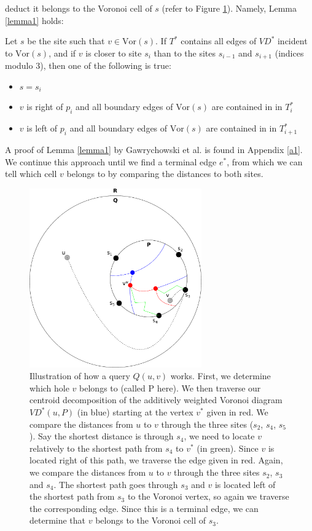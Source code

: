 deduct it belongs to the Voronoi cell of $s$ (refer to Figure \ref{vd1}). Namely, Lemma
\ref{lemma1} holds:
\begin{lemma}\label{lemma1}
  Let $s$ be the site such that $v\in \text{Vor}(s)$. If $T^*$ contains all edges of
  $VD^*$ incident to $\text{Vor}(s)$, and if $v$ is closer to site $s_i$ than to the
  sites $s_{i-1}$ and $s_{i+1}$ (indices modulo $3$), then one of the following is true:
  \begin{itemize}
    \item $s=s_i$
    \item $v$ is right of $p_i$ and all boundary edges of $\text{Vor}(s)$ are contained
      in in $T_i^*$
    \item $v$ is left of $p_i$ and all boundary edges of $\text{Vor}(s)$ are contained
      in in $T_{i+1}^*$
  \end{itemize}
\end{lemma}
\noindent A proof of Lemma \ref{lemma1} by Gawrychowski et al. \cite{gawrychowski2017better} is
found in Appendix \ref{a1}. \\
We continue this approach until we find a
terminal edge $e^*$, from which we can tell which cell $v$ belongs to by comparing the
distances to both sites.

\begin{figure}[h!]
  \centering
  \includegraphics[width=0.66\textwidth]{figs/vd1.pdf}
  \caption{Illustration of how a query $Q(u,v)$ works. First, we determine which hole $v$
  belongs to (called P here). We then traverse our centroid decomposition of the
  additively weighted Voronoi diagram $VD^*(u,P)$ (in blue) starting at the vertex $v^*$ given in
red. We compare the distances from $u$ to $v$ through the three sites ($s_2$, $s_4$,
$s_5$). Say the shortest distance is through $s_4$, we need to locate $v$ relatively to
the shortest path from $s_4$ to $v^*$ (in green). Since $v$ is
located right of this path, we traverse the edge given in red. Again, we compare the
distances from $u$ to $v$ through the three sites $s_2$, $s_3$ and $s_4$. The shortest
path goes through $s_3$ and $v$ is located left of the shortest path from $s_3$ to the
Voronoi vertex, so again we traverse the corresponding edge. Since this is a terminal
edge, we can determine that $v$ belongs to the Voronoi cell of $s_3$.}
    \label{vd1}
\end{figure}

